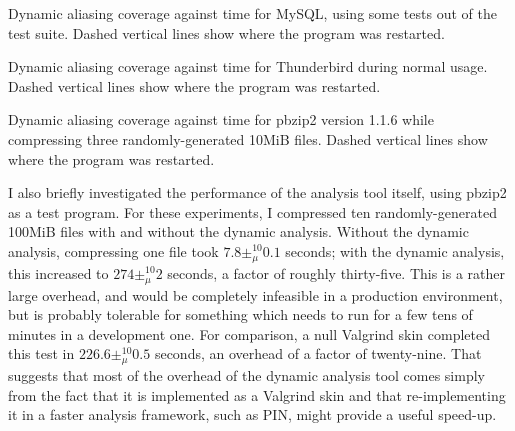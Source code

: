\begin{sanefig}
  \caption{Dynamic aliasing coverage against time for MySQL, using
    some tests out of the test suite.  Dashed vertical lines show where the
    program was restarted.}
  \label{fig:eval:dyn_convergence:mysqld}
\end{sanefig}

\begin{sanefig}
  \caption{Dynamic aliasing coverage against time for Thunderbird
    during normal usage.  Dashed vertical lines show where the program was
    restarted.}
  \label{fig:eval:dyn_convergence:thunderbird}
\end{sanefig}

\begin{sanefig}
  \caption{Dynamic aliasing coverage against time for pbzip2 version
    1.1.6 while compressing three randomly-generated 10MiB files.
    Dashed vertical lines show where the program was restarted.}
  \label{fig:eval:dyn_convergence:pbzip2}
\end{sanefig}

I also briefly investigated the performance of the analysis tool
itself, using pbzip2 as a test program.  For these experiments, I
compressed ten randomly-generated 100MiB files with and without the
dynamic analysis.  Without the dynamic analysis, compressing one file
took $7.8 \pm_\mu^{10} 0.1$ seconds; with the dynamic analysis, this
increased to $274 \pm_\mu^{10} 2$ seconds, a factor of roughly
thirty-five.  This is a rather large overhead, and would be completely
infeasible in a production environment, but is probably tolerable for
something which needs to run for a few tens of minutes in a
development one.  For comparison, a null Valgrind skin completed this
test in $226.6 \pm_\mu^{10} 0.5$ seconds, an overhead of a factor of
twenty-nine.  That suggests that most of the overhead of the dynamic
analysis tool comes simply from the fact that it is implemented as a
Valgrind skin and that re-implementing it in a faster analysis
framework, such as PIN\cite{Luk2005}, might provide a useful speed-up.

